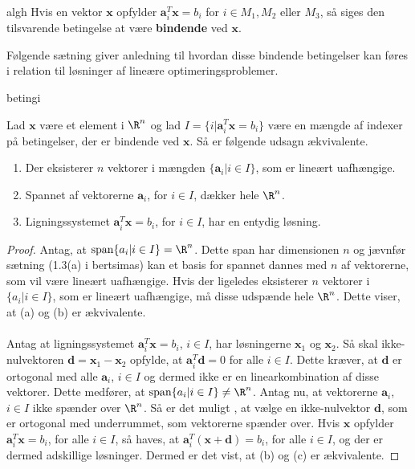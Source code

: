 %
\begin{defn}{}{algh}
Hvis en vektor $\textbf{x}$ opfylder $\textbf{a}^T_i\textbf{x}= b_i$ for $i \in M_1, M_2 \text{ eller } M_3$, så siges den tilsvarende betingelse at være \textbf{bindende} ved $\textbf{x}$.
\end{defn}\noindent
%
Følgende sætning giver anledning til hvordan disse bindende betingelser kan føres i relation til løsninger af lineære optimeringsproblemer.
%
\begin{thm}{}{betingi}

Lad $\textbf{x}$ være et element i $\R^n$ og lad $I=\{i|\textbf{a}^T_i\textbf{x}=b_i\}$ være en mængde af indexer på betingelser, der er bindende ved $\textbf{x}$.
Så er følgende udsagn ækvivalente.
%
\begin{enumerate}[label=(\alph*)]
\item Der eksisterer $n$ vektorer i mængden $\{\textbf{a}_i|i \in I \}$, som er lineært uafhængige.
\item Spannet af vektorerne $\textbf{a}_i$, for $i \in I$, dækker hele $\R^n$.
\item Ligningssystemet $\textbf{a}^T_i\textbf{x}= b_i$, for $i \in I$, har en entydig løsning.
\end{enumerate}
\end{thm}
%
\begin{proof}
Antag, at $\text{span}\{a_i|i \in I\}= \R^n$.
Dette span har dimensionen $n$ og jævnfør sætning (1.3(a) i bertsimas) kan et basis for spannet dannes med $n$ af vektorerne, som vil være lineært uafhængige.
%
Hvis der ligeledes eksisterer $n$ vektorer i $\{a_i|i \in I\}$, som er lineært uafhængige, må disse udspænde hele $\R^n$.
Dette viser, at (a) og (b) er ækvivalente.\\\\
%
Antag at ligningssystemet $\textbf{a}^T_i\textbf{x}=b_i$, $i \in I$, har løsningerne $\textbf{x}_1$ og $\textbf{x}_2$.
Så skal ikke-nulvektoren $\textbf{d} = \textbf{x}_1 - \textbf{x}_2$ opfylde, at $\textbf{a}^T_i\textbf{d}=0$ for alle $i \in I$.
Dette kræver, at $\textbf{d}$ er ortogonal med alle $\textbf{a}_i$, $i \in I$ og dermed ikke er en linearkombination af disse vektorer.
Dette medfører, at $\text{span}\{a_i|i \in I\} \neq \R^n$.
%
Antag nu, at vektorerne $\textbf{a}_i$, $i \in I$ ikke spænder over $\R^n$.
Så er det muligt , at vælge en ikke-nulvektor $\textbf{d}$, som er ortogonal med underrummet, som vektorerne spænder over.
Hvis $\textbf{x}$ opfylder  $\textbf{a}^T_i\textbf{x}= b_i$, for alle $i \in I$, så haves, at $\textbf{a}^T_i(\textbf{x}+\textbf{d})= b_i$, for alle $i \in I$, og der er dermed adskillige løsninger.
Dermed er det vist, at (b) og (c) er ækvivalente.
\end{proof}\\
